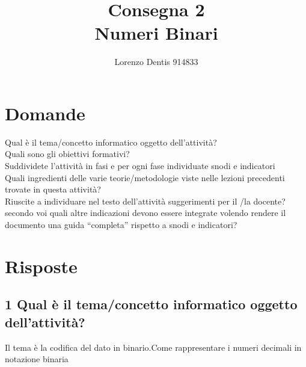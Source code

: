 \documentclass[a4paper]{article}
\begin{document}
\title{Consegna 2 \\ \large Numeri Binari} 
\author{Lorenzo Dentis 914833}
\maketitle

\section{Domande}
Qual è il tema/concetto informatico oggetto dell’attività?\\

Quali sono gli obiettivi formativi?\\

Suddividete l’attività in fasi e per ogni fase individuate snodi  e indicatori\\

Quali ingredienti delle varie teorie/metodologie viste nelle lezioni precedenti trovate in questa attività?\\

Riuscite a individuare nel testo dell’attività suggerimenti per il /la docente? secondo voi quali altre indicazioni devono essere integrate volendo rendere il documento una guida “completa” rispetto a snodi e indicatori?\\

\newpage
\section{Risposte}
\subsection{1 Qual è il tema/concetto informatico oggetto dell’attività?} 
Il tema è la codifica del dato in binario.Come rappresentare i numeri decimali in notazione binaria
\end{document}
